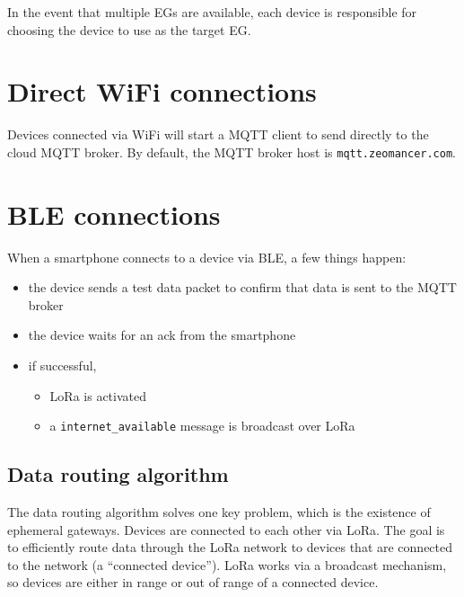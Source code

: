 \documentclass[
]{book}
\providecommand{\tightlist}{%
  \setlength{\itemsep}{0pt}\setlength{\parskip}{0pt}}
\begin{document}
In the event that multiple EGs are available,
each device is responsible for choosing the device to use as the target EG.

\hypertarget{direct-wifi-connections}{%
\section{Direct WiFi connections}\label{direct-wifi-connections}}

Devices connected via WiFi will start a MQTT client to send directly to
the cloud MQTT broker.
By default, the MQTT broker host is \texttt{mqtt.zeomancer.com}.

\hypertarget{ble-connections}{%
\section{BLE connections}\label{ble-connections}}

When a smartphone connects to a device via BLE, a few things happen:

\begin{itemize}
\tightlist
\item
  the device sends a test data packet to confirm that data is sent to the MQTT broker
\item
  the device waits for an ack from the smartphone
\item
  if successful,

  \begin{itemize}
  \tightlist
  \item
    LoRa is activated
  \item
    a \texttt{internet\_available} message is broadcast over LoRa
  \end{itemize}
\end{itemize}

\hypertarget{data-routing-algorithm}{%
\subsection{Data routing algorithm}\label{data-routing-algorithm}}

The data routing algorithm solves one key problem, which is the existence
of ephemeral gateways.
Devices are connected to each other via LoRa.
The goal is to efficiently route data through the LoRa network to
devices that are connected to the network (a ``connected device'').
LoRa works via a broadcast mechanism, so devices are either
in range or out of range of a connected device.
\end{document}
